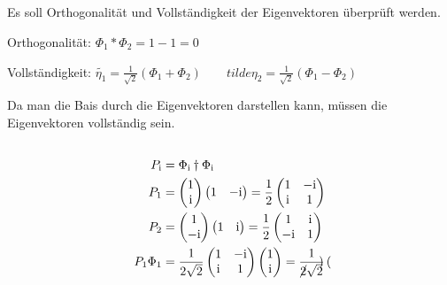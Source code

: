 \subsection{}
Es soll Orthogonalität und Vollständigkeit der Eigenvektoren überprüft werden.

Orthogonalität: $\Phi_1*\Phi_2 = 1-1 = 0$

Vollständigkeit: $\tilde{\eta_1} = \frac 1{\sqrt 2}(\Phi_1 +\Phi_2) \qquad tilde{\eta_2} = \frac 1{\sqrt 2}(\Phi_1 -\Phi_2) $

Da man die Bais durch die Eigenvektoren darstellen kann, müssen die Eigenvektoren vollständig sein.

\subsection{}
\begin{align*}
    P_\mathrm i &= \Phi_\mathrm i\dagger\Phi_\mathrm i \\
    P_1 &= 
    \begin{pmatrix}
        1 \\ \mathrm i
    \end{pmatrix}\begin{pmatrix}
        1 & -\mathrm i
    \end{pmatrix} 
    = \frac 12
    \begin{pmatrix}
        1 &-\mathrm i \\
        \mathrm i &1
    \end{pmatrix} \\
     P_2 &= 
    \begin{pmatrix}
        1 \\ -\mathrm i
    \end{pmatrix}\begin{pmatrix}
        1 & \mathrm i
    \end{pmatrix} 
    = \frac 12
    \begin{pmatrix}
        1 & \mathrm i \\
        -\mathrm i & 1
    \end{pmatrix} \\
    P_1\Phi_1 &= \frac 1{2\sqrt 2}
    \begin{pmatrix}
        1 & -\mathrm i \\
        \mathrm i & 1
    \end{pmatrix} \begin{pmatrix}
        1 \\ \mathrm i 
    \end{pmatrix}
    = \frac 1{\cancel{2}\sqrt 2}\begin{pmatrix}

\end{pmatrix}
\end{align*}
